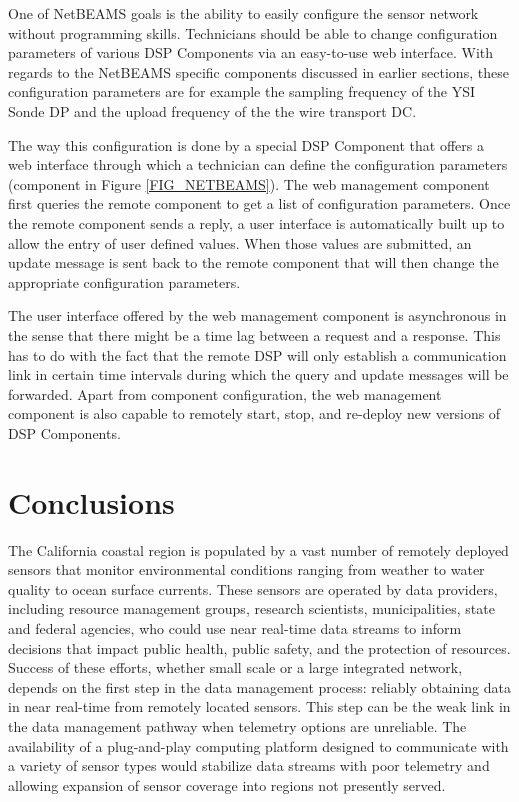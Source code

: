 \documentclass[conference]{IEEEtran}
\begin{document}
One of NetBEAMS goals is the ability to easily configure the sensor
network without programming skills. Technicians should be able to
change configuration parameters of various DSP Components via an
easy-to-use web interface. With regards to the NetBEAMS specific
components discussed in earlier sections, these configuration
parameters are for example the sampling frequency of the YSI Sonde DP
and the upload frequency of the the wire transport DC.

The way this configuration is done by a special DSP Component that
offers a web interface through which a technician can define the
configuration parameters (component  in Figure
\ref{FIG_NETBEAMS}). The web management component first queries the remote
component to get a list of configuration parameters. Once the remote
component sends a reply, a user interface is automatically built up
to allow the entry of user defined values. When those values are
submitted, an update message is sent back to the remote component that
will then change the appropriate configuration parameters.

The user interface offered by the web management component is
asynchronous in the sense that there might be a time lag between a
request and a response. This has to do with the fact that the remote
DSP will only establish a communication link in certain time intervals
during which the query and update messages will be forwarded. Apart
from component configuration, the web management component is also
capable to remotely start, stop, and re-deploy new versions of DSP
Components.

\section{Conclusions}
\label{SEC_CONCLUSION}

The California coastal region is populated by a vast number of
remotely deployed sensors that monitor environmental conditions
ranging from weather to water quality to ocean surface currents.
These sensors are operated by data providers, including resource
management groups, research scientists, municipalities, state and
federal agencies, who could use near real-time data streams to inform
decisions that impact public health, public safety, and the protection
of resources. Success of these efforts, whether small scale or a large
integrated network, depends on the first step in the data management
process: reliably obtaining data in near real-time from remotely
located sensors.  This step can be the weak link in the data
management pathway when telemetry options are unreliable.  The
availability of a plug-and-play computing platform designed to
communicate with a variety of sensor types would stabilize data
streams with poor telemetry and allowing expansion of sensor coverage
into regions not presently served.
\end{document}
